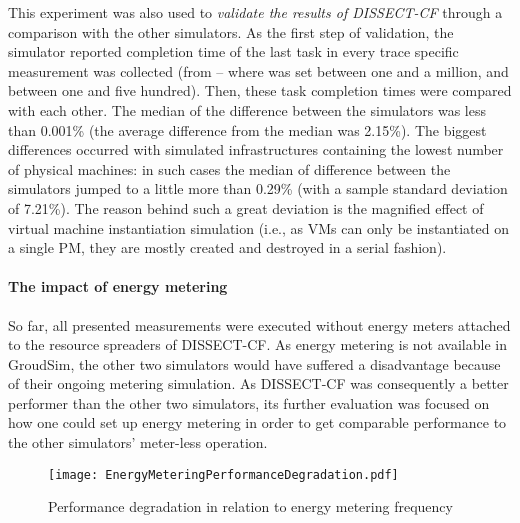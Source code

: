 \documentclass[sort, compress, 5p]{elsarticle}
\begin{document}
This experiment was also used to \emph{validate the results of DISSECT-CF} through a comparison with the other simulators. As the first step of validation, the simulator reported completion time of the last task in every trace specific measurement was collected (from  -- where  was set between one and a million, and  between one and five hundred). Then, these task completion times were compared with each other. The median of the difference between the simulators was less than 0.001\% (the average difference from the median was 2.15\%). The biggest differences occurred with simulated infrastructures containing the lowest number of physical machines: in such cases the median of difference between the simulators jumped to a little more than 0.29\% (with a sample standard deviation of 7.21\%). The reason behind such a great deviation is the magnified effect of virtual machine instantiation simulation (i.e., as VMs can only be instantiated on a single PM, they are mostly created and destroyed in a serial fashion).

\paragraph{The impact of energy metering}

So far, all presented measurements were executed without energy meters attached to the resource spreaders of DISSECT-CF. As energy metering is not available in GroudSim, the other two simulators would have suffered a disadvantage because of their ongoing metering simulation. As DISSECT-CF was consequently a better performer than the other two simulators, its further evaluation was focused on how one could set up energy metering in order to get comparable performance to the other simulators' meter-less operation.

\begin{figure}[tb]
\centering
\texttt{[image: EnergyMeteringPerformanceDegradation.pdf]}
\caption{Performance degradation in relation to energy metering frequency\label{FIG-EnergyPerformanceDrop}}
\end{figure}
\end{document}
